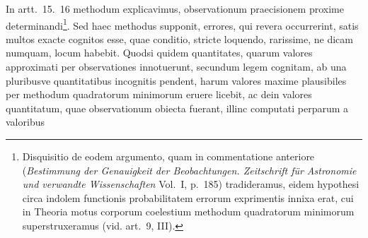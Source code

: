 In artt.\ 15.\ 16 methodum explicavimus, observationum praecisionem proxime determinandi\footnote{Disquisitio de eodem argumento, quam in commentatione anteriore (\textit{Bestimmung der Genauigkeit der Beobachtungen. Zeitschrift für Astronomie und verwandte Wissenschaften} Vol.\ I, p.\ 185) tradideramus, eidem hypothesi circa indolem functionis probabilitatem errorum exprimentis innixa erat, cui in Theoria motus corporum coelestium methodum quadratorum minimorum superstruxeramus (vid. art.\ 9, III).}. Sed haec methodus supponit, errores, qui revera occurrerint, satis multos exacte cognitos esse, quae conditio, stricte loquendo, rarissime, ne dicam numquam, locum habebit. Quodsi quidem quantitates, quarum valores approximati per observationes innotuerunt, secundum legem cognitam, ab una pluribusve quantitatibus incognitis pendent, harum valores maxime plausibiles per methodum quadratorum minimorum eruere licebit, ac dein valores quantitatum, quae observationum obiecta fuerant, illinc computati perparum a valoribus
